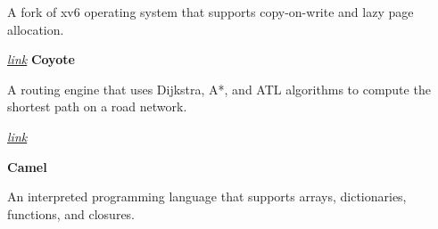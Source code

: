 \vspace{0.10 cm}
\begin{onecolentry}
	A fork of xv6 operating system that supports copy-on-write and lazy page allocation.
\end{onecolentry}
\vspace{0.2 cm}

\begin{twocolentry}{
		\textit{\href{https://github.com/mehrdad3301/coyote}{link}}}
	\textbf{Coyote}
\end{twocolentry}

\vspace{0.10 cm}
\begin{onecolentry}
	A routing engine that uses Dijkstra, A*, and ATL algorithms to compute the shortest path on a road network.  
\end{onecolentry}

\vspace{0.2 cm}

\begin{twocolentry}{
		
		
		\textit{\href{https://github.com/camel-lang/interpreter}{link}}}
	\textbf{Camel}
\end{twocolentry}

\vspace{0.10 cm}
\begin{onecolentry}
	An interpreted programming language that supports arrays, dictionaries, functions, and closures.  
\end{onecolentry}

